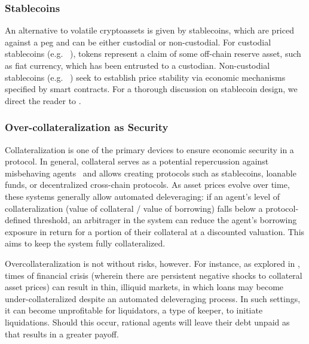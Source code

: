 \subsubsection{Stablecoins}
An alternative to volatile cryptoassets is given by stablecoins, which are priced against a peg and can be either custodial or non-custodial.
For custodial stablecoins (e.g. ~\cite{web:usdc}), tokens represent a claim of some off-chain reserve asset, such as fiat currency, which has been entrusted to a custodian.
Non-custodial stablecoins (e.g. ~\cite{whitepaper:maker}) seek to establish price stability via economic mechanisms specified by smart contracts.
For a thorough discussion on stablecoin design, we direct the reader to \cite{Klages-Mundt2020}.

\subsubsection{Over-collateralization as Security}
Collateralization is one of the primary devices to ensure economic security in a protocol.
In general, collateral serves as a potential repercussion against misbehaving agents~\cite{harz2019balance} and allows creating protocols such as stablecoins, loanable funds, or decentralized cross-chain protocols.
As asset prices evolve over time, these systems generally allow automated deleveraging: if an agent's level of collateralization (value of collateral / value of borrowing) falls below a protocol-defined threshold, an arbitrager in the system can reduce the agent's borrowing exposure in return for a portion of their collateral at a discounted valuation. This aims to keep the system fully collateralized.

Overcollateralization is not without risks, however. For instance, as explored in \cite{gudgeon2020decentralized,kao2020analysis}, times of financial crisis (wherein there are persistent negative shocks to collateral asset prices) can result in thin, illiquid markets, in which loans may become under-collateralized despite an automated deleveraging process. 
In such settings, it can become unprofitable for liquidators, a type of keeper, to initiate liquidations. 
Should this occur, rational agents will leave their debt unpaid as that results in a greater payoff.
